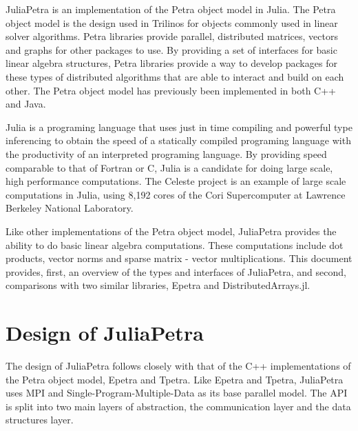 \documentclass[acmsmall]{acmart}
\begin{document}
JuliaPetra is an implementation of the Petra object model in Julia.
The Petra object model is the design used in Trilinos for objects commonly used in linear solver algorithms.
\cite{OverviewOfTrilinos}
Petra libraries provide parallel, distributed matrices, vectors and graphs for other packages to use.
By providing a set of interfaces for basic linear algebra structures, Petra libraries provide a way
to develop packages for these types of distributed algorithms that are able to interact and build on each other.
The Petra object model has previously been implemented in both C++ and Java.

Julia is a programing language that uses just in time compiling and powerful type inferencing
to obtain the speed of a statically compiled programing language with the productivity of an
interpreted programing language. \cite{JuliaFreshApproach}
By providing speed comparable to that of Fortran or C, Julia is a candidate for doing large scale,
high performance computations.
The Celeste project is an example of large scale computations in Julia,
using 8,192 cores of the Cori Supercomputer
at Lawrence Berkeley National Laboratory. \cite{JuliaFreshApproach}

Like other implementations of the Petra object model,
JuliaPetra provides the ability to do basic linear algebra computations.
These computations include dot products, vector norms and sparse matrix - vector multiplications.
This document provides, first, an overview of the types and interfaces of JuliaPetra,
and second, comparisons with two similar libraries, Epetra and DistributedArrays.jl.

\section{Design of JuliaPetra}

The design of JuliaPetra follows closely with that of the C++ implementations of the
Petra object model, Epetra and Tpetra.
Like Epetra and Tpetra, JuliaPetra uses MPI and Single-Program-Multiple-Data as its base parallel model.
The API is split into two main layers of abstraction, the communication layer and the data structures layer.
\end{document}
